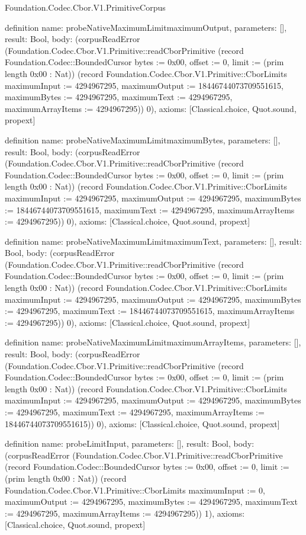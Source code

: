 \begin{lexlean}{Foundation.Codec.Cbor.V1.PrimitiveCorpus}
\begin{semanticmodule}
definition{
  name: probeNativeMaximumLimitmaximumOutput,
  parameters: [],
  result: Bool,
  body: (corpusReadError (Foundation.Codec.Cbor.V1.Primitive::readCborPrimitive (record Foundation.Codec::BoundedCursor {bytes := 0x00, offset := 0, limit := (prim length 0x00 : Nat)}) (record Foundation.Codec.Cbor.V1.Primitive::CborLimits {maximumInput := 4294967295, maximumOutput := 18446744073709551615, maximumBytes := 4294967295, maximumText := 4294967295, maximumArrayItems := 4294967295})) 0),
  axioms: [Classical.choice, Quot.sound, propext]
}

definition{
  name: probeNativeMaximumLimitmaximumBytes,
  parameters: [],
  result: Bool,
  body: (corpusReadError (Foundation.Codec.Cbor.V1.Primitive::readCborPrimitive (record Foundation.Codec::BoundedCursor {bytes := 0x00, offset := 0, limit := (prim length 0x00 : Nat)}) (record Foundation.Codec.Cbor.V1.Primitive::CborLimits {maximumInput := 4294967295, maximumOutput := 4294967295, maximumBytes := 18446744073709551615, maximumText := 4294967295, maximumArrayItems := 4294967295})) 0),
  axioms: [Classical.choice, Quot.sound, propext]
}

definition{
  name: probeNativeMaximumLimitmaximumText,
  parameters: [],
  result: Bool,
  body: (corpusReadError (Foundation.Codec.Cbor.V1.Primitive::readCborPrimitive (record Foundation.Codec::BoundedCursor {bytes := 0x00, offset := 0, limit := (prim length 0x00 : Nat)}) (record Foundation.Codec.Cbor.V1.Primitive::CborLimits {maximumInput := 4294967295, maximumOutput := 4294967295, maximumBytes := 4294967295, maximumText := 18446744073709551615, maximumArrayItems := 4294967295})) 0),
  axioms: [Classical.choice, Quot.sound, propext]
}

definition{
  name: probeNativeMaximumLimitmaximumArrayItems,
  parameters: [],
  result: Bool,
  body: (corpusReadError (Foundation.Codec.Cbor.V1.Primitive::readCborPrimitive (record Foundation.Codec::BoundedCursor {bytes := 0x00, offset := 0, limit := (prim length 0x00 : Nat)}) (record Foundation.Codec.Cbor.V1.Primitive::CborLimits {maximumInput := 4294967295, maximumOutput := 4294967295, maximumBytes := 4294967295, maximumText := 4294967295, maximumArrayItems := 18446744073709551615})) 0),
  axioms: [Classical.choice, Quot.sound, propext]
}

definition{
  name: probeLimitInput,
  parameters: [],
  result: Bool,
  body: (corpusReadError (Foundation.Codec.Cbor.V1.Primitive::readCborPrimitive (record Foundation.Codec::BoundedCursor {bytes := 0x00, offset := 0, limit := (prim length 0x00 : Nat)}) (record Foundation.Codec.Cbor.V1.Primitive::CborLimits {maximumInput := 0, maximumOutput := 4294967295, maximumBytes := 4294967295, maximumText := 4294967295, maximumArrayItems := 4294967295})) 1),
  axioms: [Classical.choice, Quot.sound, propext]
}


\end{semanticmodule}
\end{lexlean}
